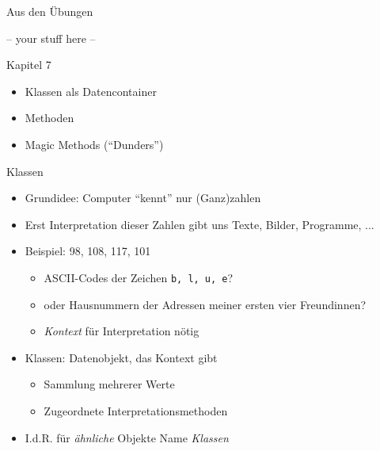 
\begin{frame}[fragile]{Aus den Übungen}
%
\begin{center}
	-- your stuff here --
\end{center}
%
\end{frame}


\begin{frame}[fragile]{Kapitel 7}
%
\begin{itemize}
\item Klassen als Datencontainer
\item Methoden
\item Magic Methods (\enquote{Dunders})
\end{itemize}
%
\end{frame}


\begin{frame}{Klassen}
%
\begin{itemize}
\item Grundidee: Computer \enquote{kennt} nur (Ganz)zahlen
\item Erst Interpretation dieser Zahlen gibt uns Texte, Bilder, Programme, ...
\item Beispiel: 98, 108, 117, 101
	\begin{itemize}
	\item ASCII-Codes der Zeichen \texttt{b, l, u, e}?
	\item oder Hausnummern der Adressen meiner ersten vier Freundinnen?
	\item \emph{Kontext} für Interpretation nötig
	\end{itemize}
\item Klassen: Datenobjekt, das Kontext gibt
	\begin{itemize}
	\item Sammlung mehrerer Werte
	\item Zugeordnete Interpretationsmethoden
	\end{itemize}
\item I.\;d.\;R. für \emph{ähnliche} Objekte \Thus Name \emph{Klassen}
\end{itemize}
%
\end{frame}


